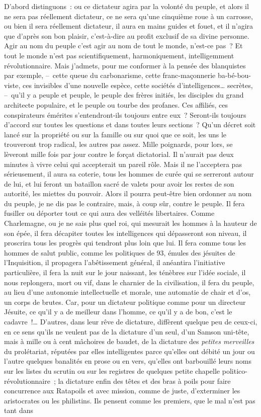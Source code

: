 \documentclass[french,twoside]{book} %
\begin{document}
D’abord distinguons : ou ce dictateur agira par la volonté du peuple, et alors il ne sera pas réellement dictateur, ce ne sera qu’une cinquième roue à un carrosse, ou bien il sera réellement dictateur, il aura en mains guides et fouet, et il n’agira que d’après son bon plaisir, c’est-à-dire au profit exclusif de sa divine personne. Agir au nom du peuple c’est agir au nom de tout le monde, n’est-ce pas ? Et tout le monde n’est pas scientifiquement, harmoniquement, intelligemment révolutionnaire. Mais j’admets, pour me conformer à la pensée des blanquistes par exemple, – cette queue du carbonarisme, cette franc-maçonnerie ba-bé-bou-viste, ces invisibles d’une nouvelle espèce, cette sociétés d’intelligences… secrètes, – qu’il y a peuple et peuple, le peuple des frères initiés, les disciples du grand architecte populaire, et le peuple ou tourbe des profanes. Ces affiliés, ces conspirateurs émérites s’entendront-ils toujours entre eux ? Seront-ils toujours d’accord sur toutes les questions et dans toutes leurs sections ? Qu’un décret soit lancé sur la propriété ou sur la famille ou sur quoi que ce soit, les uns le trouveront trop radical, les autres pas assez. Mille poignards, pour lors, se lèveront mille fois par jour contre le forçat dictatorial. Il n’aurait pas deux minutes à vivre celui qui accepterait un pareil rôle. Mais il ne l’acceptera pas sérieusement, il aura sa coterie, tous les hommes de curée qui se serreront autour de lui, et lui feront un bataillon sacré de valets pour avoir les restes de son autorité, les miettes du pouvoir. Alors il pourra peut-être bien ordonner au nom du peuple, je ne dis pas le contraire, mais, à coup sûr, contre le peuple. Il fera fusiller ou déporter tout ce qui aura des velléités libertaires. Comme Charlemagne, ou je ne sais plus quel roi, qui mesurait les hommes à la hauteur de son épée, il fera décapiter toutes les intelligences qui dépasseront son niveau, il proscrira tous les progrès qui tendront plus loin que lui. Il fera comme tous les hommes de salut public, comme les politiques de 93, émules des jésuites de l’Inquisition, il propagera l’abêtissement général, il anéantira l’initiative particulière, il fera la nuit sur le jour naissant, les ténèbres sur l’idée sociale, il nous replongera, mort ou vif, dans le charnier de la civilisation, il fera du peuple, au lieu d’une autonomie intellectuelle et morale, une automatie de chair et d’os, un corps de brutes. Car, pour un dictateur politique comme pour un directeur Jésuite, ce qu’il y a de meilleur dans l’homme, ce qu’il y a de bon, c’est le cadavre !… D’autres, dans leur rêve de dictature, diffèrent quelque peu de ceux-ci, en ce sens qu’ils ne veulent pas de la dictature d’un seul, d’un Samson uni-tête, mais à mille ou à cent mâchoires de baudet, de la dictature des \emph{petites merveilles} du prolétariat, réputées par elles intelligentes parce qu’elles ont débité un jour ou l’autre quelques banalités en prose ou en vers, qu’elles ont barbouillé leurs noms sur les listes du scrutin ou sur les registres de quelques petite chapelle politico-révolutionnaire ; la dictature enfin des têtes et des bras à poils pour faire concurrence aux Ratapoils et avec mission, comme de juste, d’exterminer les aristocrates ou les philistins. Ils pensent comme les premiers, que le mal n’est pas tant dans 
\end{document}
